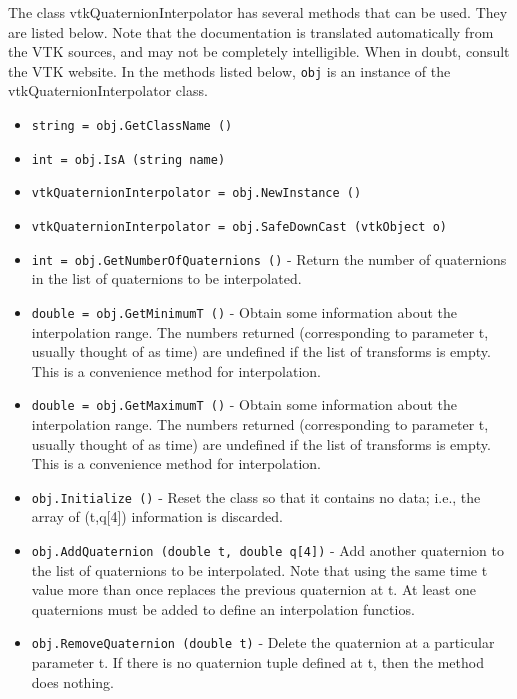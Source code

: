 The class vtkQuaternionInterpolator has several methods that can be used.
  They are listed below.
Note that the documentation is translated automatically from the VTK sources,
and may not be completely intelligible.  When in doubt, consult the VTK website.
In the methods listed below, \verb|obj| is an instance of the vtkQuaternionInterpolator class.
\begin{itemize}
\item  \verb|string = obj.GetClassName ()|

\item  \verb|int = obj.IsA (string name)|

\item  \verb|vtkQuaternionInterpolator = obj.NewInstance ()|

\item  \verb|vtkQuaternionInterpolator = obj.SafeDownCast (vtkObject o)|

\item  \verb|int = obj.GetNumberOfQuaternions ()| -  Return the number of quaternions in the list of quaternions to be
 interpolated.

\item  \verb|double = obj.GetMinimumT ()| -  Obtain some information about the interpolation range. The numbers
 returned (corresponding to parameter t, usually thought of as time)
 are undefined if the list of transforms is empty. This is a convenience
 method for interpolation.

\item  \verb|double = obj.GetMaximumT ()| -  Obtain some information about the interpolation range. The numbers
 returned (corresponding to parameter t, usually thought of as time)
 are undefined if the list of transforms is empty. This is a convenience
 method for interpolation.

\item  \verb|obj.Initialize ()| -  Reset the class so that it contains no data; i.e., the array of (t,q[4])
 information is discarded.

\item  \verb|obj.AddQuaternion (double t, double q[4])| -  Add another quaternion to the list of quaternions to be interpolated.
 Note that using the same time t value more than once replaces the
 previous quaternion at t.  At least one quaternions must be added to
 define an interpolation functios.

\item  \verb|obj.RemoveQuaternion (double t)| -  Delete the quaternion at a particular parameter t. If there is no
 quaternion tuple defined at t, then the method does nothing.


\end{itemize}
